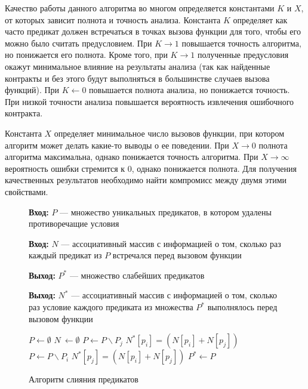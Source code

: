 Качество работы данного алгоритма во многом определяется константами $K$ и $X$, от которых зависит полнота и точность анализа. Константа $K$ определяет как часто предикат должен встречаться в точках вызова функции для того, чтобы его можно было считать предусловием. При $K \to 1$ повышается точность алгоритма, но понижается его полнота. Кроме того, при $K \to 1$ полученные предусловия окажут минимальное влияние на результаты анализа (так как найденные контракты и без этого будут выполняться в большинстве случаев вызова функций). При $K \leftarrow 0$ повышается полнота анализа, но понижается точность. При низкой точности анализа повышается вероятность извлечения ошибочного контракта. 

Константа $X$ определяет минимальное число вызовов функции, при котором алгоритм может делать какие-то выводы о ее поведении. При $X \to 0$ полнота алгоритма максимальна, однако  понижается точность алгоритма. При $X \to \infty$ вероятность ошибки стремится к 0, однако понижается полнота. Для получения качественных результатов необходимо найти компромисс между двумя этими свойствами.

\begin{figure}[h!]
\textbf{Вход:} $P$ --- множество уникальных предикатов, в котором удалены противоречащие условия

\textbf{Вход:} $N$ --- ассоциативный массив с информацией о том, сколько раз каждый предикат из $P$ встречался перед вызовом функции

\textbf{Выход:} $P^*$ --- множество слабейших предикатов

\textbf{Выход:} $N^*$ --- ассоциативный массив с информацией о том, сколько раз условие каждого предиката из множества $P^*$ выполнялось перед вызовом функции

\begin{algorithmic}[1]
\State $P \leftarrow \emptyset$
\State $N\ \leftarrow \emptyset$
			\State $P \leftarrow P \backslash P_j$
			\State $N^*[p_i] = (N[p_i] + N[p_j])$
		\Else 
				\State $P \leftarrow P \backslash P_i$
				\State $N^*[p_j] = (N[p_i] + N[p_j])$
    			\EndIf
    		\EndIf
    \EndFor
\EndFor
\State $P^* \leftarrow P$
\end{algorithmic}
\caption{Алгоритм слияния предикатов}
\label{image:megringAlgoritm}
\end{figure}


